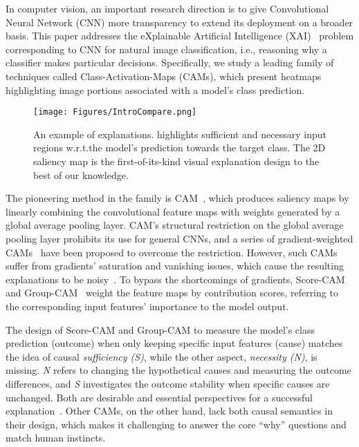 In computer vision, an important research direction is to give Convolutional Neural Network (CNN) more transparency to extend its deployment on a broader basis.
This paper addresses the eXplainable Artificial Intelligence (XAI)~\cite{gunning2017explainable} problem corresponding to CNN for natural image classification, i.e., reasoning why a classifier makes particular decisions.
Specifically, we study a leading family of techniques called Class-Activation-Maps (CAMs), which present heatmaps highlighting image portions associated with a model's class prediction.
\begin{figure}[thbp]
  \centering
   \texttt{[image: Figures/IntroCompare.png]}
   \caption{An example of \name{} explanations. \name{} highlights sufficient and necessary input regions w.r.t.\;the model's prediction towards the target class. The 2D saliency map is the first-of-its-kind visual explanation design to the best of our knowledge.}
   \label{fig:Intro Compare}
\end{figure}
The pioneering method in the family is CAM~\cite{zhou2016learning}, which produces saliency maps by linearly combining the convolutional feature maps with weights generated by a global average pooling layer.
CAM's structural restriction on the global average pooling layer prohibits its use for general CNNs, and a series of gradient-weighted CAMs~\cite{selvaraju2017grad,chattopadhay2018grad,omeiza2019smooth} have been proposed to overcome the restriction.
However, such CAMs suffer from gradients' saturation and vanishing issues, which cause the resulting explanations to be noisy~\cite{ghorbani2019interpretation}.
To bypass the shortcomings of gradients, Score-CAM~\cite{wang2019score} and Group-CAM~\cite{zhang2021group} weight the feature maps by contribution scores, referring to the corresponding input features' importance to the model output.

The design of Score-CAM and Group-CAM to measure the model's class prediction (outcome) when only keeping specific input features (cause) matches the idea of causal \textit{sufficiency (S)}, while the other aspect, \textit{necessity (N)}, is missing.
\textit{N} refers to changing the hypothetical causes and measuring the outcome differences, and \textit{S} investigates the outcome stability when specific causes are unchanged.
Both are desirable and essential perspectives for a successful explanation~\cite{lipton1990contrastive,woodward2006sensitive,grinfeld2020causal,watson2021local}.
Other CAMs, on the other hand, lack both causal semantics in their design, which makes it challenging to answer the core ``why'' questions and match human instincts.

